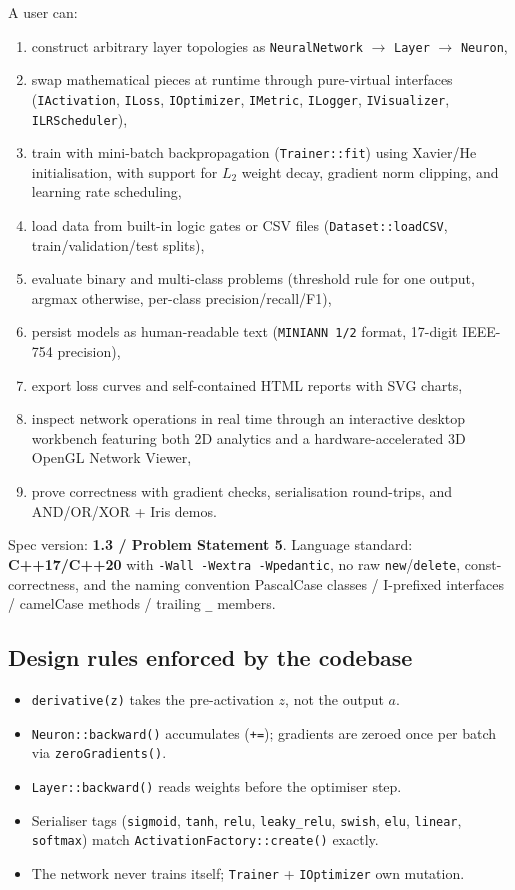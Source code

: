 \documentclass[11pt,a4paper]{article}
\begin{document}
A user can:
\begin{enumerate}[itemsep=2pt]
    \item construct arbitrary layer topologies as \texttt{NeuralNetwork} $\to$ \texttt{Layer} $\to$ \texttt{Neuron},
    \item swap mathematical pieces at runtime through pure-virtual interfaces (\texttt{IActivation}, \texttt{ILoss}, \texttt{IOptimizer}, \texttt{IMetric}, \texttt{ILogger}, \texttt{IVisualizer}, \texttt{ILRScheduler}),
    \item train with mini-batch backpropagation (\texttt{Trainer::fit}) using Xavier/He initialisation, with support for $L_2$ weight decay, gradient norm clipping, and learning rate scheduling,
    \item load data from built-in logic gates or CSV files (\texttt{Dataset::loadCSV}, train/validation/test splits),
    \item evaluate binary and multi-class problems (threshold rule for one output, argmax otherwise, per-class precision/recall/F1),
    \item persist models as human-readable text (\texttt{MINIANN 1/2} format, 17-digit IEEE-754 precision),
    \item export loss curves and self-contained HTML reports with SVG charts,
    \item inspect network operations in real time through an interactive desktop workbench featuring both 2D analytics and a hardware-accelerated 3D OpenGL Network Viewer,
    \item prove correctness with gradient checks, serialisation round-trips, and AND/OR/XOR + Iris demos.
\end{enumerate}

Spec version: \textbf{1.3 / Problem Statement 5}. Language standard: \textbf{C++17/C++20} with \texttt{-Wall -Wextra -Wpedantic}, no raw \texttt{new}/\texttt{delete}, const-correctness, and the naming convention PascalCase classes / I-prefixed interfaces / camelCase methods / trailing \texttt{\_} members.

\subsection{Design rules enforced by the codebase}
\begin{itemize}[itemsep=2pt]
    \item \texttt{derivative(z)} takes the pre-activation $z$, not the output $a$.
    \item \texttt{Neuron::backward()} accumulates (\texttt{+=}); gradients are zeroed once per batch via \texttt{zeroGradients()}.
    \item \texttt{Layer::backward()} reads weights before the optimiser step.
    \item Serialiser tags (\texttt{sigmoid}, \texttt{tanh}, \texttt{relu}, \texttt{leaky\_relu}, \texttt{swish}, \texttt{elu}, \texttt{linear}, \texttt{softmax}) match \texttt{ActivationFactory::create()} exactly.
    \item The network never trains itself; \texttt{Trainer} + \texttt{IOptimizer} own mutation.
\end{itemize}
\end{document}
